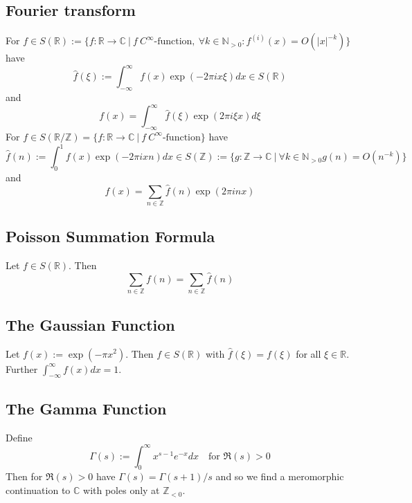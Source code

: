 \documentclass{scrartcl}
\newcommand{\R}{\mathbb{R}}
\newcommand{\N}{\mathbb{N}}
\newcommand{\Z}{\mathbb{Z}}
\newcommand{\C}{\mathbb{C}}
\begin{document}
\subsection{Fourier transform}
For $f \in S(\R) := \{ f: \R \to \C \ | \ f \ \text{$C^\infty$-function}, \ \forall k \in \N_{> 0}: f^{(i)}(x) = O(|x|^{-k}) \}$ have
\begin{equation*}
    \hat{f}(\xi) := \int_{-\infty}^{\infty} f(x) \exp(-2\pi i x \xi) dx \in S(\R)
\end{equation*}
and
\begin{equation*}
    f(x) = \int_{-\infty}^{\infty} \hat{f}(\xi) \exp(2\pi i \xi x) d\xi
\end{equation*}
For $f \in S(\R/\Z) = \{ f: \R \to \C \ | \ f \ \text{$C^\infty$-function}\}$ have
\begin{equation*}
    \hat{f}(n) := \int_0^1 f(x) \exp(-2\pi i x n) dx \in S(\Z) := \{ g: \Z \to \C \ | \ \forall k \in \N_{> 0} g(n) = O(n^{-k})\}
\end{equation*}
and
\begin{equation*}
    f(x) = \sum_{n \in \Z} \hat{f}(n) \exp(2\pi i n x)
\end{equation*}

\subsection{Poisson Summation Formula}
Let $f \in S(\R)$. Then
\begin{equation*}
    \sum_{n \in \Z} f(n) = \sum_{n \in \Z} \hat{f}(n)
\end{equation*}

\subsection{The Gaussian Function}
Let $f(x) := \exp(-\pi x^2)$. Then $f \in S(\R)$ with $\hat{f}(\xi) = f(\xi)$ for all $\xi \in \R$.
Further $\int_{-\infty}^\infty f(x) dx = 1$.

\subsection{The Gamma Function}
Define
\begin{equation*}
    \Gamma(s) := \int_0^\infty x^{s - 1} e^{-x} dx \quad \text{for $\Re(s) > 0$}
\end{equation*}
Then for $\Re(s) > 0$ have $\Gamma(s) = \Gamma(s + 1) / s$ and so we find a meromorphic continuation to $\C$ with poles only at $\Z_{< 0}$.
\end{document}
